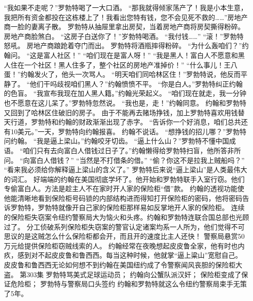 \documentclass[a4paper,12pt,UTF8,twoside]{ctexbook}
\begin{document}
        “我如果不走呢？”罗勃特喝了一大口酒。  
        “那我就得倾家荡产了！我是小本生意，我把所有资金都投在这栋楼上了！我看出您特有钱，您不会见死不救的……”房地产商一脸的妻离子散。  
        罗勃特从抽屉里拿出房契，当着房地产商将房契撕得粉碎。  
        房地产商脸煞白。  
        “这房子白送你了！”岁勃特喝酒。  
        “我付钱……”  
        “滚！”罗勃特怒吼。  
        房地产商踉跄着夺门而出。  
        罗勃特将酒瓶摔得粉碎。  
        “为什么轰咱们？”约翰问。  
        “这是富人社区！”  
        “咱们现在是富人呀！”  
        “我是黑人！富白人不愿意和黑人住在一个社区！黑人住多了，整个社区的房地产准掉价！”  
        “什么事儿！王八蛋！”约翰发火了，他头一次骂人。        
        “明天咱们同哈林区住！”罗勃特说，他反而平静了。  
        “他们干吗歧视咱们黑人？”约翰愤愤不平。  
        “你是白人。”罗勃特纠正约翰的色盲。  
        “我宣布我现在加人黑人籍。”约翰光荣起义。  
        “咱们现在就走，我一分钟也不愿意在这儿呆了。”罗勃特忽然说。  
        “我也是，走！”约翰同意。  
        约翰和罗勃特又回到了哈林区住破旧的房子。  
        由于不能再去赌场挣钱，加上罗勃特喜欢用钱替天行道，罗勃特和约翰的财政渐渐出现了赤字。  
        “告诉你一个好消息，咱们总共还有10美元。”一天，罗勃特向约翰报喜。  
        约翰不说话。  
        “想挣钱的招儿哪？”罗勃特问约翰。  
        “我是逼上梁山。”约翰咬牙切齿。  
        “逼上什么山？”罗勃特不懂中国成语。  
        “咱们只有去向富白人借钱过日子了。”约翰懒得给罗勃特扫盲，他所答非所问。  
        “向富白人借钱？”  
        “当然是不打借条的借。”  
        “偷？你这不是拉我上贼船吗？”  
        “看来我必须给你解释逼上梁山的含义了。”  
        罗勃特后来说“逼上梁山”是人类最伟大的词汇。  
        好端端的约翰在美国彻底学坏了。他开始和罗勃特联手入室行窃。他们专偷富白人。方法是趁主人不在家时开人家的保险柜“借”款。  
        约翰的透视功能使他能清晰地看到保险柜号码锁的内部结构进而得知打开保险柜的密码，他将密码告诉罗勃特，罗勃特就像开自己家的保险柜那样易如反掌地开人家的保险柜。  
        连续的保险柜失窃案令纽约警察局大为恼火和头疼。约翰和罗勃特连联合国总部也光顾过了。  
        分工侦破系列保险柜失窃案的警官认定诸案均系一人所为，他们觉得不可思议的是这贼怎么什么保险柜都会开，而且开的速度比主人还快！  
        警察局悬赏50万元给提供保险柜窃贼线索的人。  
        约翰经常在夜晚想起皮皮鲁全家，他有时也内疚，感到对不起皮皮鲁和鲁西西。每当这种时候，他就掌“逼上粱山”宽慰自己。  
        皮皮鲁和鲁西西无论如何想不到约翰在美国纽约成了令警察闻风丧胆的保险柜大盗。          第303集  
        罗勃特骂美式足球运动员；  
        约翰向公蟹队派汉奸；  
        保险柜变成了保证危险柜；  
        罗勃特与警察局口头签约    
        约翰和罗勃特就这么令纽约警察局束手无策了5年。  
\end{document}
